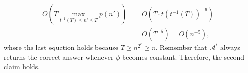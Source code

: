 \begin{align*}
O\left(T\max_{t^{-1}(T)\leq n'\leq T}p(n')\right)&=O(T\cdot t(t^{-1}(T))^{-6})\\
&=O(T^{-5})=O(n^{-5}),
\end{align*}
where the last equation holds because $T\geq n^{2^c}\geq n$. Remember that $\mathcal A^*$ always returns the correct answer whenever $\phi$ becomes constant. Therefore, the second claim holds.
